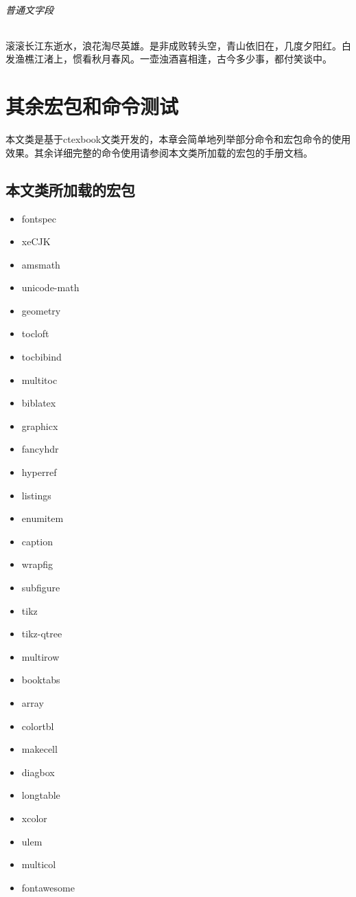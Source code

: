 \documentclass{../../PublicResources/DocClassLight}
\begin{document}
    \subparagraph{普通文字段} 滚滚长江东逝水，浪花淘尽英雄。是非成败转头空，青山依旧在，几度夕阳红。白发渔樵江渚上，惯看秋月春风。一壶浊酒喜相逢，古今多少事，都付笑谈中。

    \chapter{其余宏包和命令测试}
    \begin{intro}
        本文类是基于ctexbook文类开发的，本章会简单地列举部分命令和宏包命令的使用效果。其余详细完整的命令使用请参阅本文类所加载的宏包的手册文档。
    \end{intro}

    \section{本文类所加载的宏包}
    \begin{multicols}{4}
        \begin{itemize}
            \item fontspec
            \item xeCJK
            \item amsmath
            \item unicode-math
            \item geometry
            \item tocloft
            \item tocbibind
            \item multitoc
            \item biblatex
            \item graphicx
            \item fancyhdr
            \item hyperref
            \item listings
            \item enumitem
            \item caption
            \item wrapfig
            \item subfigure
            \item tikz
            \item tikz-qtree
            \item multirow
            \item booktabs
            \item array
            \item colortbl
            \item makecell
            \item diagbox
            \item longtable
            \item xcolor
            \item ulem
            \item multicol
            \item fontawesome
        \end{itemize}
    \end{multicols}
\end{document}
